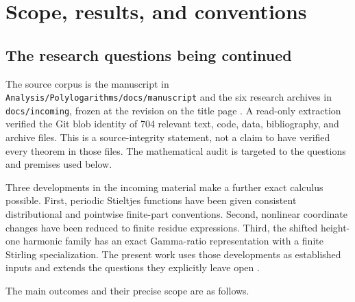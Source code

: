 \section{Scope, results, and conventions}
\label{scope:sec}

\subsection{The research questions being continued}

The source corpus is the manuscript in
\texttt{Analysis/Polylogarithms/docs/manuscript} and the six research
archives in \texttt{docs/incoming}, frozen at the revision on the title
page \cite{Repo}. A read-only extraction verified the Git blob identity
of 704 relevant text, code, data, bibliography, and archive files.
This is a source-integrity statement, not a claim to have verified every
theorem in those files. The mathematical audit is targeted to the
questions and premises used below.

Three developments in the incoming material make a further exact
calculus possible. First, periodic Stieltjes functions have been given
consistent distributional and pointwise finite-part conventions.
Second, nonlinear coordinate changes have been reduced to finite
residue expressions. Third, the shifted height-one harmonic family
has an exact Gamma-ratio representation with a finite Stirling
specialization. The present work uses those developments as
established inputs and extends the questions they explicitly leave
open \cite{IncomingCoincident,IncomingTransport,IncomingExact}.

The main outcomes and their precise scope are as follows.

